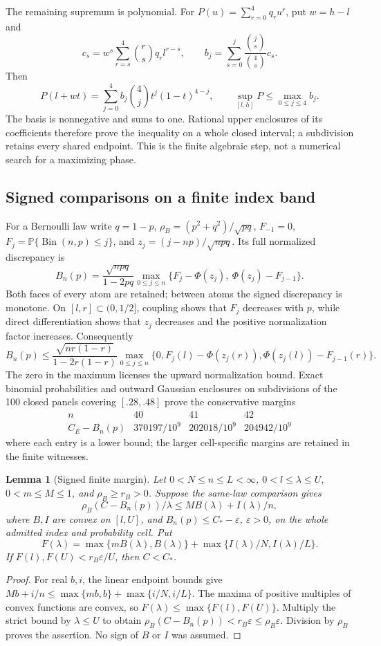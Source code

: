 \documentclass[11pt,a4paper]{article}
\numberwithin{equation}{section}
\newtheorem{lemma}[theorem]{Lemma}
\theoremstyle{definition}
\theoremstyle{remark}
\newcommand{\Pp}{\mathbb P}
\begin{document}
The remaining supremum is polynomial. For
\(P(u)=\sum_{r=0}^4q_ru^r\), put \(w=h-l\) and
\[
 c_s=w^s\sum_{r=s}^4\binom rsq_rl^{r-s},\qquad
 b_j=\sum_{s=0}^j\frac{\binom js}{\binom4s}c_s.
\]
Then
\[
 P(l+wt)=\sum_{j=0}^4 b_j\binom4j t^j(1-t)^{4-j},\qquad
 \sup_{[l,h]}P\le\max_{0\le j\le4}b_j.
\]
The basis is nonnegative and sums to one. Rational upper
enclosures of its coefficients therefore prove the inequality
on a whole closed interval; a subdivision retains every shared
endpoint. This is the finite algebraic step, not a numerical
search for a maximizing phase.

\subsection{Signed comparisons on a finite index band}
For a Bernoulli law write \(q=1-p\),
\(\rho_B=(p^2+q^2)/\sqrt{pq}\), \(F_{-1}=0\),
\(F_j=\Pp\{\operatorname{Bin}(n,p)\le j\}\), and
\(z_j=(j-np)/\sqrt{npq}\). Its full normalized discrepancy is
\[
 B_n(p)=\frac{\sqrt{npq}}{1-2pq}
 \max_{0\le j\le n}\{F_j-\Phi(z_j),\ \Phi(z_j)-F_{j-1}\}.
\]
Both faces of every atom are retained; between atoms the signed
discrepancy is monotone. On \([l,r]\subset(0,1/2]\), coupling
shows that \(F_j\) decreases with \(p\), while direct
differentiation shows that \(z_j\) decreases and the positive
normalization factor increases. Consequently
\[
 B_n(p)\le\frac{\sqrt{nr(1-r)}}{1-2r(1-r)}
 \max_{0\le j\le n}
 \{0,F_j(l)-\Phi(z_j(r)),\Phi(z_j(l))-F_{j-1}(r)\}.
\]
The zero in the maximum licenses the upward normalization bound.
Exact binomial probabilities and outward Gaussian enclosures on
subdivisions of the 100 closed panels covering \([.28,.48]\)
prove the conservative margins
\[
 \begin{array}{c|ccc}
 n&40&41&42\\\hline
 C_E-B_n(p)&370197/10^9&202018/10^9&204942/10^9
 \end{array}
\]
where each entry is a lower bound; the larger cell-specific margins
are retained in the finite witnesses.

\begin{lemma}[Signed finite margin]\label{cut31:finite-margin}
Let \(0<N\le n\le L<\infty\), \(0<l\le\lambda\le U\),
\(0<m\le M\le1\), and \(\rho_B\ge r_B>0\).
Suppose the same-law comparison gives
\[
 \rho_B(C-B_n(p))/\lambda\le M B(\lambda)+I(\lambda)/n,
\]
where \(B,I\) are convex on \([l,U]\), and
\(B_n(p)\le C_*-\varepsilon\), \(\varepsilon>0\), on the
whole admitted index and probability cell. Put
\[
 F(\lambda)=\max\{mB(\lambda),B(\lambda)\}
             +\max\{I(\lambda)/N,I(\lambda)/L\}.
\]
If \(F(l),F(U)<r_B\varepsilon/U\), then \(C<C_*\).
\end{lemma}
\begin{proof}
For real \(b,i\), the linear endpoint bounds give
\(Mb+i/n\le\max\{mb,b\}+\max\{i/N,i/L\}\).
The maxima of positive multiples of convex functions are convex,
so \(F(\lambda)\le\max\{F(l),F(U)\}\).
Multiply the strict bound by \(\lambda\le U\) to obtain
\(\rho_B(C-B_n(p))<r_B\varepsilon\le\rho_B\varepsilon\).
Division by \(\rho_B\) proves the assertion. No sign of
\(B\) or \(I\) was assumed.
\end{proof}
\end{document}
